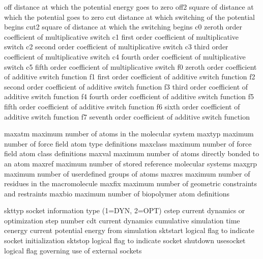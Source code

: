 \documentclass[letterpaper,11pt,english]{sphinxmanual}
\begin{document}
\begin{sphinxVerbatim}[commandchars=\\\{\}]
off             distance at which the potential energy goes to zero
off2            square of distance at which the potential goes to zero
cut             distance at which switching of the potential begins
cut2            square of distance at which the switching begins
c0              zeroth order coefficient of multiplicative switch
c1              first order coefficient of multiplicative switch
c2              second order coefficient of multiplicative switch
c3              third order coefficient of multiplicative switch
c4              fourth order coefficient of multiplicative switch
c5              fifth order coefficient of multiplicative switch
f0              zeroth order coefficient of additive switch function
f1              first order coefficient of additive switch function
f2              second order coefficient of additive switch function
f3              third order coefficient of additive switch function
f4              fourth order coefficient of additive switch function
f5              fifth order coefficient of additive switch function
f6              sixth order coefficient of additive switch function
f7              seventh order coefficient of additive switch function
\end{sphinxVerbatim}

\sphinxAtStartPar
{}

\begin{sphinxVerbatim}[commandchars=\\\{\}]
maxatm          maximum number of atoms in the molecular system
maxtyp          maximum number of force field atom type definitions
maxclass        maximum number of force field atom class definitions
maxval          maximum number of atoms directly bonded to an atom
maxref          maximum number of stored reference molecular systems
maxgrp          maximum number of user\PYGZhy{}defined groups of atoms
maxres          maximum number of residues in the macromolecule
maxfix          maximum number of geometric constraints and restraints
maxbio          maximum number of biopolymer atom definitions
\end{sphinxVerbatim}

\sphinxAtStartPar
{}

\begin{sphinxVerbatim}[commandchars=\\\{\}]
skttyp          socket information type (1=DYN, 2=OPT)
cstep           current dynamics or optimization step number
cdt             current dynamics cumulative simulation time
cenergy         current potential energy from simulation
sktstart        logical flag to indicate socket initialization
sktstop         logical flag to indicate socket shutdown
use\PYGZus{}socket      logical flag governing use of external sockets
\end{sphinxVerbatim}
\end{document}
